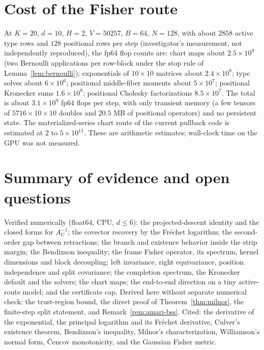 \documentclass[11pt]{article}
\theoremstyle{definition}
\theoremstyle{remark}
\begin{document}
\section{Cost of the Fisher route}\label{sec:cost-fisher}

At $K=20$, $d=10$, $H=2$, $V=50257$, $B=64$, $N=128$, with about $2858$ active type rows and $128$ positional rows per step (investigator's measurement, not independently reproduced), the fp64 flop counts are: chart maps about $2.5\times10^9$ (two Bernoulli applications per row-block under the stop rule of Lemma~\ref{lem:bernoulli}); exponentials of $10\times10$ matrices about $2.4\times10^8$; type solves about $6\times10^6$; positional middle-fiber moments about $5\times10^7$; positional Kronecker sums $1.6\times10^8$; positional Cholesky factorizations $8.5\times10^7$. The total is about $3.1\times10^9$ fp64 flops per step, with only transient memory (a few tensors of $5716\times10\times10$ doubles and $20.5$ MB of positional operators) and no persistent state. The materialized-series chart route of the current pullback code is estimated at $2$ to $5\times10^{11}$. These are arithmetic estimates; wall-clock time on the GPU was not measured.

\section{Summary of evidence and open questions}\label{sec:summary}

Verified numerically (float64, CPU, $d\le6$): the projected-descent identity and the closed forms for $A_U^{-1}$; the covector recovery by the Fr\'echet logarithm; the second-order gap between retractions; the branch and existence behavior inside the strip margin; the Bendixson inequality; the frame Fisher operator, its spectrum, kernel dimensions and block decoupling; left invariance, right equivariance, position independence and split covariance; the completion spectrum, the Kronecker default and the solvers; the chart maps; the end-to-end direction on a tiny active-route model; and the certificate cap. Derived here without separate numerical check: the trust-region bound, the direct proof of Theorem~\ref{thm:milnor}, the finite-step split statement, and Remark~\ref{rem:amari-bss}. Cited: the derivative of the exponential, the principal logarithm and its Fr\'echet derivative, Culver's existence theorem, Bendixson's inequality, Milnor's characterization, Williamson's normal form, \v{C}encov monotonicity, and the Gaussian Fisher metric.
\end{document}
